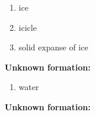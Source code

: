 \begin{enumerate}
\item ice
\item icicle
\item solid expanse of ice
\end{enumerate}
\noindent\textbf{Unknown formation:}\\

\begin{enumerate}
\item water
\end{enumerate}
\noindent\textbf{Unknown formation:}\\

